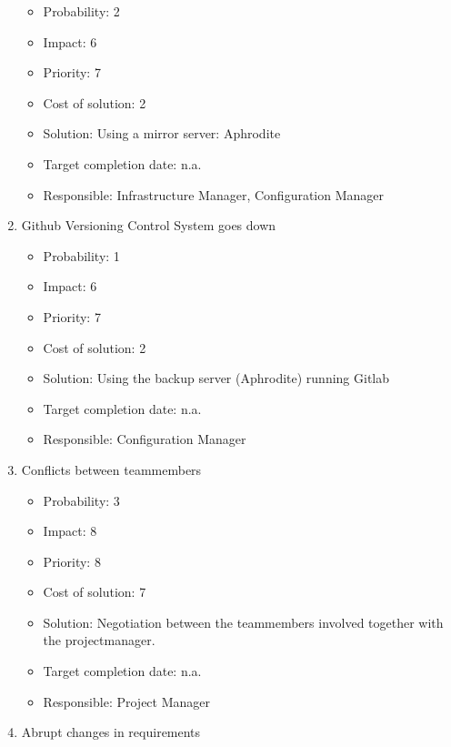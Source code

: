 \documentclass[9pt]{article}
\begin{document}
\begin{enumerate}
  \begin{itemize}
  \itemsep1pt\parskip0pt
  \item
    Probability: 2
  \item
    Impact: 6
  \item
    Priority: 7
  \item
    Cost of solution: 2
  \item
    Solution: Using a mirror server: Aphrodite
  \item
    Target completion date: n.a.
  \item
    Responsible: Infrastructure Manager, Configuration Manager
  \end{itemize}
\item
  Github Versioning Control System goes down

  \begin{itemize}
  \itemsep1pt\parskip0pt
  \item
    Probability: 1
  \item
    Impact: 6
  \item
    Priority: 7
  \item
    Cost of solution: 2
  \item
    Solution: Using the backup server (Aphrodite) running Gitlab
  \item
    Target completion date: n.a.
  \item
    Responsible: Configuration Manager
  \end{itemize}
\item
  Conflicts between teammembers

  \begin{itemize}
  \itemsep1pt\parskip0pt
  \item
    Probability: 3
  \item
    Impact: 8
  \item
    Priority: 8
  \item
    Cost of solution: 7
  \item
    Solution: Negotiation between the teammembers involved together with
    the projectmanager.
  \item
    Target completion date: n.a.
  \item
    Responsible: Project Manager
  \end{itemize}
\item
  Abrupt changes in requirements


\end{enumerate}
\end{document}
